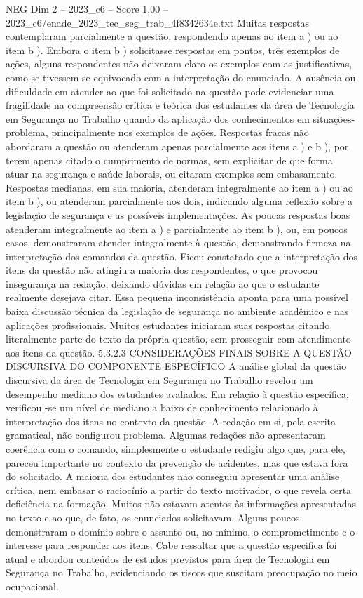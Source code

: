 \begin{textsample}{NEG Dim 2 – 2023\_c6 – Score 1.00 – 2023\_c6/enade\_2023\_tec\_seg\_trab\_4f8342634e.txt}
Muitas respostas contemplaram parcialmente a questão, respondendo apenas ao item a ) ou ao item b ).
Embora o item b ) solicitasse respostas em pontos, três exemplos de ações, alguns respondentes não deixaram claro os exemplos com as justificativas, como se tivessem se equivocado com a interpretação do enunciado.
A ausência ou dificuldade em atender ao que foi solicitado na questão pode evidenciar uma fragilidade na compreensão crítica e teórica dos estudantes da área de Tecnologia em Segurança no Trabalho quando da aplicação dos conhecimentos em situações-problema, principalmente nos exemplos de ações.
Respostas fracas não abordaram a questão ou atenderam apenas parcialmente aos itens a ) e b ), por terem apenas citado o cumprimento de normas, sem explicitar de que forma atuar na segurança e saúde laborais, ou citaram exemplos sem embasamento.
Respostas medianas, em sua maioria, atenderam integralmente ao item a ) ou ao item b ), ou atenderam parcialmente aos dois, indicando alguma reflexão sobre a legislação de segurança e as possíveis implementações.
As poucas respostas boas atenderam integralmente ao item a ) e parcialmente ao item b ), ou, em poucos casos, demonstraram atender integralmente à questão, demonstrando firmeza na interpretação dos comandos da questão.
Ficou constatado que a interpretação dos itens da questão não atingiu a maioria dos respondentes, o que provocou insegurança na redação, deixando dúvidas em relação ao que o estudante realmente desejava citar.
Essa pequena inconsistência aponta para uma possível baixa discussão técnica da legislação de segurança no ambiente acadêmico e nas aplicações profissionais.
Muitos estudantes iniciaram suas respostas citando literalmente parte do texto da própria questão, sem prosseguir com atendimento aos itens da questão. 5.3.2.3 CONSIDERAÇÕES FINAIS SOBRE A QUESTÃO DISCURSIVA DO COMPONENTE ESPECÍFICO A análise global da questão discursiva da área de Tecnologia em Segurança no Trabalho revelou um desempenho mediano dos estudantes avaliados.
Em relação à questão específica, verificou -se um nível de mediano a baixo de conhecimento relacionado à interpretação dos itens no contexto da questão.
A redação em si, pela escrita gramatical, não configurou problema.
Algumas redações não apresentaram coerência com o comando, simplesmente o estudante redigiu algo que, para ele, pareceu importante no contexto da prevenção de acidentes, mas que estava fora do solicitado.
A maioria dos estudantes não conseguiu apresentar uma análise crítica, nem embasar o raciocínio a partir do texto motivador, o que revela certa deficiência na formação.
Muitos não estavam atentos às informações apresentadas no texto e ao que, de fato, os enunciados solicitavam.
Alguns poucos demonstraram o domínio sobre o assunto ou, no mínimo, o comprometimento e o interesse para responder aos itens.
Cabe ressaltar que a questão especifica foi atual e abordou conteúdos de estudos previstos para área de Tecnologia em Segurança no Trabalho, evidenciando os riscos que suscitam preocupação no meio ocupacional.

\end{textsample}
